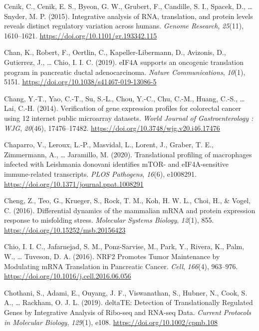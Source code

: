 \documentclass[12pt,openany]{book}
\begin{document}
\hypertarget{ref-Cenik2015}{}
Cenik, C., Cenik, E. S., Byeon, G. W., Grubert, F., Candille, S. I.,
Spacek, D., \ldots{} Snyder, M. P. (2015). Integrative analysis of RNA,
translation, and protein levels reveals distinct regulatory variation
across humans. \emph{Genome Research}, \emph{25}(11), 1610--1621.
\url{https://doi.org/10.1101/gr.193342.115}

\hypertarget{ref-Chan2019}{}
Chan, K., Robert, F., Oertlin, C., Kapeller-Libermann, D., Avizonis, D.,
Gutierrez, J., \ldots{} Chio, I. I. C. (2019). eIF4A supports an
oncogenic translation program in pancreatic ductal adenocarcinoma.
\emph{Nature Communications}, \emph{10}(1), 5151.
\url{https://doi.org/10.1038/s41467-019-13086-5}

\hypertarget{ref-Chang2014}{}
Chang, Y.-T., Yao, C.-T., Su, S.-L., Chou, Y.-C., Chu, C.-M., Huang,
C.-S., \ldots{} Lai, C.-H. (2014). Verification of gene expression
profiles for colorectal cancer using 12 internet public microarray
datasets. \emph{World Journal of Gastroenterology : WJG}, \emph{20}(46),
17476--17482. \url{https://doi.org/10.3748/wjg.v20.i46.17476}

\hypertarget{ref-Chaparro2020}{}
Chaparro, V., Leroux, L.-P., Masvidal, L., Lorent, J., Graber, T. E.,
Zimmermann, A., \ldots{} Jaramillo, M. (2020). Translational profiling
of macrophages infected with Leishmania donovani identifies mTOR- and
eIF4A-sensitive immune-related transcripts. \emph{PLOS Pathogens},
\emph{16}(6), e1008291.
\url{https://doi.org/10.1371/journal.ppat.1008291}

\hypertarget{ref-Cheng2016}{}
Cheng, Z., Teo, G., Krueger, S., Rock, T. M., Koh, H. W. L., Choi, H.,
\& Vogel, C. (2016). Differential dynamics of the mammalian mRNA and
protein expression response to misfolding stress. \emph{Molecular
Systems Biology}, \emph{12}(1), 855.
\url{https://doi.org/10.15252/msb.20156423}

\hypertarget{ref-Chio2016}{}
Chio, I. I. C., Jafarnejad, S. M., Ponz-Sarvise, M., Park, Y., Rivera,
K., Palm, W., \ldots{} Tuveson, D. A. (2016). NRF2 Promotes Tumor
Maintenance by Modulating mRNA Translation in Pancreatic Cancer.
\emph{Cell}, \emph{166}(4), 963--976.
\url{https://doi.org/10.1016/j.cell.2016.06.056}

\hypertarget{ref-Chothani2019}{}
Chothani, S., Adami, E., Ouyang, J. F., Viswanathan, S., Hubner, N.,
Cook, S. A., \ldots{} Rackham, O. J. L. (2019). deltaTE: Detection of
Translationally Regulated Genes by Integrative Analysis of Ribo-seq and
RNA-seq Data. \emph{Current Protocols in Molecular Biology},
\emph{129}(1), e108. \url{https://doi.org/10.1002/cpmb.108}
\end{document}

